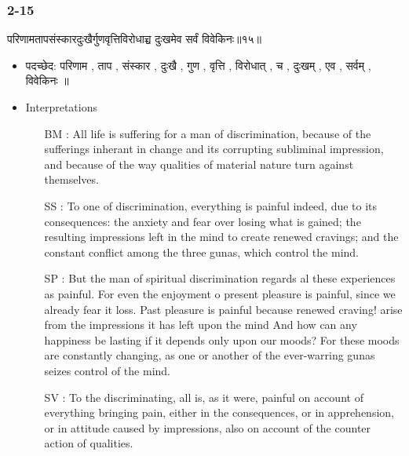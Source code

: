 \begin{frame}[fragile]\frametitle{2-15}
\begin{sanskrit}
परिणामतापसंस्कारदुःखैर्गुणवृत्तिविरोधाच्च दुःखमेव सर्वं विवेकिनः॥१५॥
\end{sanskrit}

	\begin{itemize}
	\item पदच्छेद: परिणाम , ताप , संस्कार , दुःखै , गुण , वृत्ति , विरोधात् , च , दुःखम् , एव , सर्वम् , विवेकिनः ॥
	\item Interpretations
		\begin{itemize}
		\item [BM]: All life is suffering for a man of discrimination, because of the sufferings inherant in change and its corrupting subliminal impression, and because of the way qualities of material nature turn against themselves.
		\item [SS]: To one of discrimination, everything is painful indeed, due to its consequences: the anxiety and fear over losing what is gained; the resulting impressions left in the mind to create renewed cravings; and the constant conflict among the three gunas, which control the mind.
		\item [SP]: But the man of spiritual discrimination regards al these experiences as painful. For even the enjoyment o present pleasure is painful, since we already fear it loss. Past pleasure is painful because renewed craving! arise from the impressions it has left upon the mind And how can any happiness be lasting if it depends only upon our moods? For these moods are constantly changing, as one or another of the ever-warring gunas seizes control of the mind.
		\item [SV]: To the discriminating, all is, as it were, painful on account of everything bringing pain, either in the consequences, or in apprehension, or in attitude caused by impressions, also on account of the counter action of qualities. 
		\end{itemize}
	\end{itemize}
	
\end{frame}


